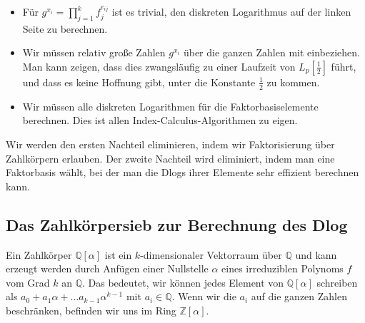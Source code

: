 \begin{refsegment}
\begin{itemize}
\item Für $g^{x_i} = \prod_{j=1}^k f_j^{e_{ij}}$ ist es trivial, den diskreten Logarithmus auf der linken Seite zu berechnen.
\end{itemize}

\begin{itemize}
\item Wir müssen relativ große Zahlen $g^{x_i}$ über die ganzen Zahlen mit einbeziehen. Man kann zeigen, dass dies zwangsläufig zu einer Laufzeit von $L_p[\frac 1 2]$ führt, und dass es keine Hoffnung gibt, unter die Konstante $\frac 1 2$ zu kommen.
\DIFdelbegin %

\DIFdelend \item Wir müssen alle diskreten Logarithmen für die Faktorbasiselemente berechnen. Dies ist allen Index-Calculus-Algorithmen zu eigen.
\end{itemize}

Wir werden den ersten Nachteil eliminieren, indem wir Faktorisierung über Zahlkörpern erlauben.
Der zweite Nachteil wird eliminiert, indem man eine Faktorbasis wählt, bei der man die Dlogs ihrer Elemente sehr effizient berechnen kann.



\subsection[Das Zahlkörpersieb zur Berechnung des Dlog]{Das Zahlkörpersieb zur Berechnung des Dlog\footnotemark}
\label{nfs-dlog}

Ein Zahlkörper $\mathbb{Q}[\alpha]$ ist ein $k$-dimensionaler Vektorraum über $\mathbb{Q}$ und kann erzeugt werden durch Anfügen einer Nullstelle $\alpha$ eines irreduziblen Polynoms $f$ vom Grad $k$ an $\mathbb{Q}$. Das bedeutet, wir können jedes Element von $\mathbb{Q}[\alpha]$ schreiben als $a_0+a_1\alpha + \ldots a_{k-1}\alpha^{k-1}$ mit $a_i \in \mathbb{Q}$. Wenn wir die $a_i$ auf die ganzen Zahlen beschränken, befinden wir uns im Ring $\mathbb{Z}[\alpha]$.


\end{refsegment}
